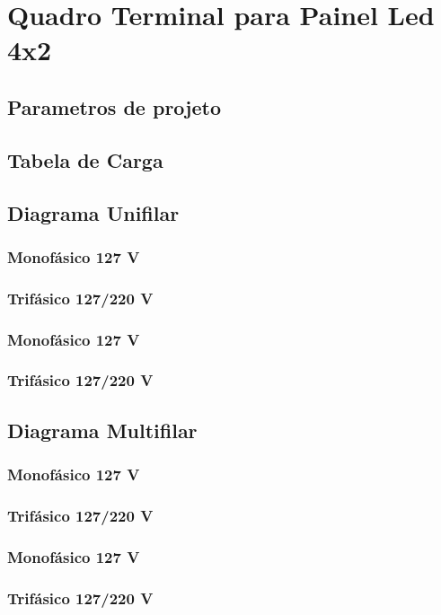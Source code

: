 \section{Quadro Terminal para Painel Led 4x2}

\subsection{Parametros de projeto}

\subsection{Tabela de Carga}
\subsection{Diagrama Unifilar}
\subsubsection{Monofásico 127 V}
\subsubsection{Trifásico 127/220 V}
\subsubsection{Monofásico 127 V}
\subsubsection{Trifásico 127/220 V}

\subsection{Diagrama Multifilar}
\subsubsection{Monofásico 127 V}
\subsubsection{Trifásico 127/220 V}
\subsubsection{Monofásico 127 V}
\subsubsection{Trifásico 127/220 V}

